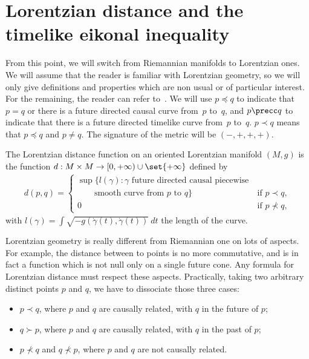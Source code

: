 \section{Lorentzian distance and the timelike eikonal inequality}

From this point, we will switch from Riemannian manifolds to Lorentzian ones. We will assume that the reader is familiar with Lorentzian geometry, so we will only give def\/initions and pro\-per\-ties which are non usual or of particular interest. For the remaining, the reader can refer to~\cite{Beem,ONeill}. We will use $p \preceq q$ to indicate that $p = q$ or there is a future directed causal curve from~$p$ to~$q$, and $p \precc q$ to indicate that there is a future directed timelike curve from~$p$ to~$q$. $p \prec q$ means that $p \preceq q$ and $p\neq q$. The signature of the metric will be $(-,+,+,+)$.

\begin{definition}
The Lorentzian distance function on an oriented Lorentzian manifold $(M,g)$ is the function $d : M \times M \rightarrow [0,+\infty) \cup \set{+\infty}$ def\/ined by
\begin{gather*}
d(p,q) =
\begin{cases}
 \sup\{ l(\gamma) : \gamma \text{ future directed causal piecewise} \ & \ \\
  \qquad \text{smooth curve from $p$ to $q$}\} &\text{if } p \prec q,\\
 0 &\text{if } p \nprec q,
\end{cases}
 \end{gather*}
 with $l(\gamma) = \int \sqrt{ -g( \dot\gamma(t) ,  \dot\gamma(t) )}\ dt$ the length of the curve.
\end{definition}

Lorentzian geometry is really dif\/ferent from Riemannian one on lots of aspects. For example, the distance between to points is no more commutative, and is in fact a function which is not null only on a single future cone. Any formula for Lorentzian distance must respect these aspects. Practically, taking two arbitrary distinct points $p$ and $q$, we have to dissociate those three cases:
\begin{itemize}\itemsep=0pt
\item $p \prec q$, where $p$ and $q$ are causally related, with $q$ in the future of $p$;
\item $q \succ p$, where $p$ and $q$ are causally related, with $q$ in the past of $p$;
\item $p \nprec q$ and $q \nprec p$, where $p$ and $q$ are not causally related.
\end{itemize}

